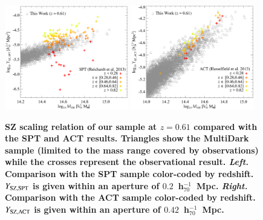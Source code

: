 \documentclass[useAMS,usenatbib]{mn2e}
\begin{document}
\begin{figure} 
\centering
\includegraphics[width=0.48\textwidth]{figures/sz_m_SPT.eps}
\includegraphics[width=0.48\textwidth]{figures/sz_m_ACT.eps}
\caption{{\bf SZ scaling relation of our sample at $z=0.61$ compared with the SPT and ACT results. 
  Triangles show the MultiDark sample (limited to the mass range covered by observations) 
  while the crosses represent the observational result. \emph{Left.} Comparison with the 
  SPT sample \protect\citep{2013ApJ...763..127R} color-coded by redshift. 
  $Y_{{\mathrm{SZ, SPT}}}$ is given within an aperture of  $0.2$~h$_{70}^{-1}$~Mpc.
  \emph{Right.} Comparison with the ACT sample \protect\citep{2013JCAP...07..008H} color-coded 
  by redshift. $Y_{{\mathrm{SZ, ACT}}}$ is given within an aperture of $0.42$~h$_{70}^{-1}$~Mpc.}}
\label{fig:SZ_M_1}
\end{figure}
\end{document}
